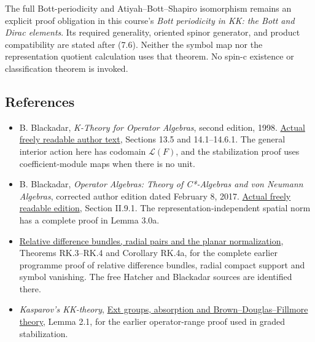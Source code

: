 \documentclass[
  11pt,
]{article}
\begin{document}
The full Bott-periodicity and Atiyah--Bott--Shapiro isomorphism remains
an explicit proof obligation in this course's \emph{Bott periodicity in
KK: the Bott and Dirac elements}. Its required generality, oriented
spinor generator, and product compatibility are stated after (7.6).
Neither the symbol map nor the representation quotient calculation uses
that theorem. No spin-c existence or classification theorem is invoked.

\subsection{References}\label{references}

\begin{itemize}
\item
  B. Blackadar, \emph{K-Theory for Operator Algebras}, second edition,
  1998.
  \href{https://www.bruceblackadar.com/Mathematics/book6.pdf}{Actual
  freely readable author text}, Sections 13.5 and 14.1--14.6.1. The
  general interior action here has codomain \(\mathcal L(F)\), and the
  stabilization proof uses coefficient-module maps when there is no
  unit.
\item
  B. Blackadar, \emph{Operator Algebras: Theory of C*-Algebras and von
  Neumann Algebras}, corrected author edition dated February 8, 2017.
  \href{https://www.bruceblackadar.com/Mathematics/Cycr.pdf}{Actual
  freely readable edition}, Section II.9.1. The
  representation-independent spatial norm has a complete proof in Lemma
  3.0a.
\item
  \href{supporting/relative-k-foundations/relative-k-foundations.html\#rk-difference}{Relative
  difference bundles, radial pairs and the planar normalization},
  Theorems RK.3--RK.4 and Corollary RK.4a, for the complete earlier
  programme proof of relative difference bundles, radial compact support
  and symbol vanishing. The free Hatcher and Blackadar sources are
  identified there.
\item
  \emph{Kasparov's KK-theory}, \href{KT-KK-02.html}{Ext groups,
  absorption and Brown--Douglas--Fillmore theory}, Lemma 2.1, for the
  earlier operator-range proof used in graded stabilization.
\end{itemize}
\end{document}
